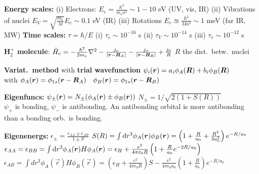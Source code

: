 \squishline

\textbf{Energy scales:} (i) Electrons: $E_e = \frac{\hbar^2}{m_e a^2}\sim 1-10$ eV (UV, vis, IR)
(ii) Vibrations of nuclei $E_V = \sqrt{\frac{m_e}{M}}E_e \sim 0.1$ eV (IR) (iii) Rotations $E_r \approxeq \frac{\hbar^2}{Ma^2} \sim 1$ meV (far IR, MW)
\textbf{Time scales:} $\tau = \hbar/E$ (i) $\tau_e \sim 10^{-16}$ s (ii) $\tau_V \sim 10^{-14}$ s (iii) $\tau_r \sim 10^{-12}$ s

\squishline

\textbf{H$_2^+$ molecule}: $\hat{H}_e = - \frac{\hbar^2}{2m_e} \nabla^2 - \frac{j_o}{|\bm{r} - \bm{R}_A|} - \frac{j_o}{|\bm{r} - \bm{R}_B|} + \frac{j_0}{R}$ \quad $R$ the dist.\ betw.\ nuclei 
\begin{squishlist}
    \item \textbf{Variat.\ method} with \textbf{trial wavefunction} $\psi_i(\bm{r}) = a_i \phi_A(\bm{R}) + b_i \phi_B(\bm{R})$ \\ with $\phi_A(\bm{r})=\phi_{1s}(\bm{r} - \bm{R}_A) \quad \phi_B(\bm{r})=\phi_{1s}(\bm{r} - \bm{R}_B)$ 
    \item \textbf{Eigenfuncs:} $\psi_{\pm}(\bm{r}) = N_{\pm} (\phi_A(\bm{r})\pm \phi_B(\bm{r}))$ \quad $N_{\pm} = 1/\sqrt{2(1+S(R))} $
     \\
    $\psi_+$ is bonding, $\psi_-$ is antibonding. An antibonding orbital is more antibonding than a bonding orb.\ is bonding.
    \item \textbf{Eigenenergs:} $\epsilon_{\pm} = \frac{\epsilon_{AA} \pm \epsilon_{AB}}{1\pm S}$ \quad  $S(R) = \int \textrm{d} r^3 \phi_A(\bm{r}) \phi_B(\bm{r}) = \left(1 + \frac{R}{a_0} + \frac{R^2}{3a_0^2}\right) e^{-R/a_0}$\\
    $\epsilon_{AA} = \epsilon_{BB} = \int \textrm{d} r^3 \phi_{A}(\bm{r}) H \phi_{A}(\bm{r}) = \epsilon_H + \frac{e^2}{4\pi\varepsilon_0 R}\left(1 + \frac{R}{a_0}e^{-2R/a_0}\right)$ \\
    $\epsilon_{AB} = \int dr^3 \phi_A(\vec{r}) H \phi_B(\vec{r}) = \left(\epsilon_H +  \frac{e^2}{4 \pi \epsilon_0R}\right) S - \frac{e^2}{4 \pi \epsilon_0a_0} \left( 1 + \frac{R}{a_0} \right) e^{-R/a_0}$
\end{squishlist}

\squishline

